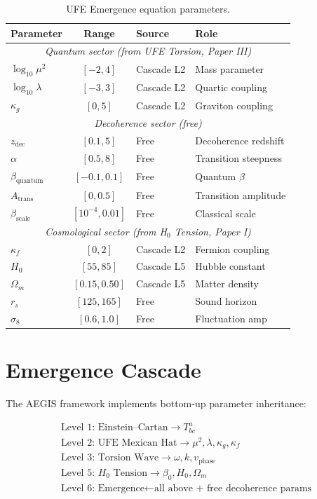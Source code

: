 \documentclass[twocolumn,prd,superscriptaddress,nofootinbib]{revtex4-2}
\begin{document}
\begin{table}[h]
\caption{UFE Emergence equation parameters.}
\begin{ruledtabular}
\begin{tabular}{lcll}
Parameter & Range & Source & Role \\
\hline
\multicolumn{4}{c}{\textit{Quantum sector (from UFE Torsion, Paper III)}} \\
$\log_{10}\mu^2$ & $[-2, 4]$ & Cascade L2 & Mass parameter \\
$\log_{10}\lambda$ & $[-3, 3]$ & Cascade L2 & Quartic coupling \\
$\kappa_g$ & $[0, 5]$ & Cascade L2 & Graviton coupling \\
\hline
\multicolumn{4}{c}{\textit{Decoherence sector (free)}} \\
$z_\text{dec}$ & $[0.1, 5]$ & Free & Decoherence redshift \\
$\alpha$ & $[0.5, 8]$ & Free & Transition steepness \\
$\beta_\text{quantum}$ & $[-0.1, 0.1]$ & Free & Quantum $\beta$ \\
$A_\text{trans}$ & $[0, 0.5]$ & Free & Transition amplitude \\
$\beta_\text{scale}$ & $[10^{-4}, 0.01]$ & Free & Classical scale \\
\hline
\multicolumn{4}{c}{\textit{Cosmological sector (from H$_0$ Tension, Paper I)}} \\
$\kappa_f$ & $[0, 2]$ & Cascade L2 & Fermion coupling \\
$H_0$ & $[55, 85]$ & Cascade L5 & Hubble constant \\
$\Omega_m$ & $[0.15, 0.50]$ & Cascade L5 & Matter density \\
$r_s$ & $[125, 165]$ & Free & Sound horizon \\
$\sigma_8$ & $[0.6, 1.0]$ & Free & Fluctuation amp \\
\end{tabular}
\end{ruledtabular}
\end{table}

\section{Emergence Cascade}

The AEGIS framework implements bottom-up parameter inheritance:

\begin{align*}
&\text{Level 1: Einstein--Cartan} \to T^a_{bc} \\
&\text{Level 2: UFE Mexican Hat} \to \mu^2, \lambda, \kappa_g, \kappa_f \\
&\text{Level 3: Torsion Wave} \to \omega, k, v_\text{phase} \\
&\text{Level 5: } H_0 \text{ Tension} \to \beta_0, H_0, \Omega_m \\
&\text{Level 6: Emergence} \leftarrow \text{all above + free decoherence params}
\end{align*}
\end{document}
